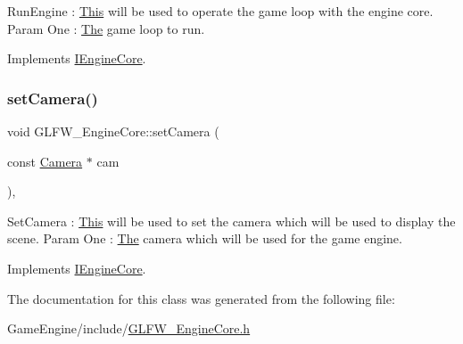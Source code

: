 Run\+Engine \+: \mbox{\hyperlink{class_this}{This}} will be used to operate the game loop with the engine core. Param One \+: \mbox{\hyperlink{class_the}{The}} game loop to run. 

Implements \mbox{\hyperlink{class_i_engine_core_ad03940f571ec20ba7427feeca44ace21}{I\+Engine\+Core}}.

\mbox{\label{class_g_l_f_w___engine_core_a2aba4fb8a635f96fc4057ba841670a29}} 
\subsubsection{\texorpdfstring{set\+Camera()}{setCamera()}}
{\footnotesize\ttfamily void G\+L\+F\+W\+\_\+\+Engine\+Core\+::set\+Camera (\begin{DoxyParamCaption}\item[{const \mbox{\hyperlink{class_camera}{Camera}} $\ast$}]{cam }\end{DoxyParamCaption})\hspace{0.3cm}{\ttfamily [override]}, {\ttfamily [virtual]}}

Set\+Camera \+: \mbox{\hyperlink{class_this}{This}} will be used to set the camera which will be used to display the scene. Param One \+: \mbox{\hyperlink{class_the}{The}} camera which will be used for the game engine. 

Implements \mbox{\hyperlink{class_i_engine_core_ab2f643ce25708c87b20eecdcbb18b9ac}{I\+Engine\+Core}}.



The documentation for this class was generated from the following file\+:\begin{DoxyCompactItemize}
\item 
Game\+Engine/include/\mbox{\hyperlink{_g_l_f_w___engine_core_8h}{G\+L\+F\+W\+\_\+\+Engine\+Core.\+h}}\end{DoxyCompactItemize}
